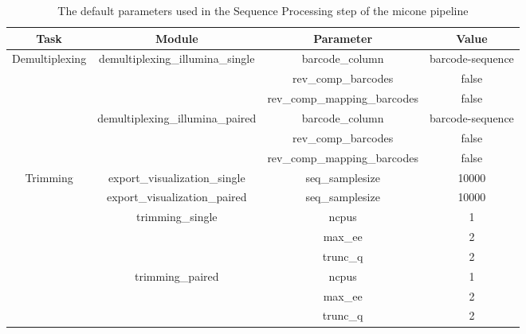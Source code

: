 \begin{table}[H]
\centering
\small
\begin{tabular}{|c|c|c|c|}
\hline
 \textbf{Task}                   & \textbf{Module}                                   & \textbf{Parameter}           & \textbf{Value}   \\ \hline
 \multirow{6}{*}{Demultiplexing} & \multirow{3}{*}{demultiplexing\_illumina\_single} & barcode\_column              & barcode-sequence \\
                                 &                                                   & rev\_comp\_barcodes          & false            \\
                                 &                                                   & rev\_comp\_mapping\_barcodes & false            \\ \cline{3-4}
                                 & \multirow{3}{*}{demultiplexing\_illumina\_paired} & barcode\_column              & barcode-sequence \\
                                 &                                                   & rev\_comp\_barcodes          & false            \\
                                 &                                                   & rev\_comp\_mapping\_barcodes & false            \\ \cline{2-4}
 \multirow{8}{*}{Trimming}       & export\_visualization\_single                     & seq\_samplesize              & 10000            \\ \cline{3-4}
                                 & export\_visualization\_paired                     & seq\_samplesize              & 10000            \\ \cline{3-4}
                                 & \multirow{3}{*}{trimming\_single}                 & ncpus                        & 1                \\
                                 &                                                   & max\_ee                      & 2                \\
                                 &                                                   & trunc\_q                     & 2                \\ \cline{3-4}
                                 & \multirow{3}{*}{trimming\_paired}                 & ncpus                        & 1                \\
                                 &                                                   & max\_ee                      & 2                \\
                                 &                                                   & trunc\_q                     & 2                \\ \hline
\end{tabular}
\caption{The default parameters used in the Sequence Processing step of the \ac{micone} pipeline}
\label{tab:sp_parameters}
\end{table}

